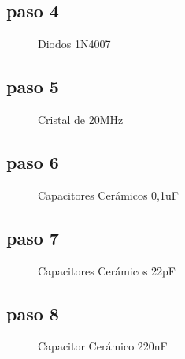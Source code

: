 \documentclass[letterpaper,10pt,english]{sphinxmanual}
\begin{document}
\subsection{paso 4}
\label{np07:paso-4}\begin{figure}[htbp]
\centering
\capstart

\noindent{}
\caption{Diodos 1N4007}\label{np07:id10}\end{figure}
\newpage

\subsection{paso 5}
\label{np07:paso-5}\begin{figure}[htbp]
\centering
\capstart

\noindent{}
\caption{Cristal de 20MHz}\label{np07:id11}\end{figure}
\newpage

\subsection{paso 6}
\label{np07:paso-6}\begin{figure}[htbp]
\centering
\capstart

\noindent{}
\caption{Capacitores Cerámicos 0,1uF}\label{np07:id12}\end{figure}
\newpage

\subsection{paso 7}
\label{np07:paso-7}\begin{figure}[htbp]
\centering
\capstart

\noindent{}
\caption{Capacitores Cerámicos 22pF}\label{np07:id13}\end{figure}
\newpage

\subsection{paso 8}
\label{np07:paso-8}\begin{figure}[htbp]
\centering
\capstart

\noindent{}
\caption{Capacitor Cerámico 220nF}\label{np07:id14}\end{figure}
\newpage
\end{document}
